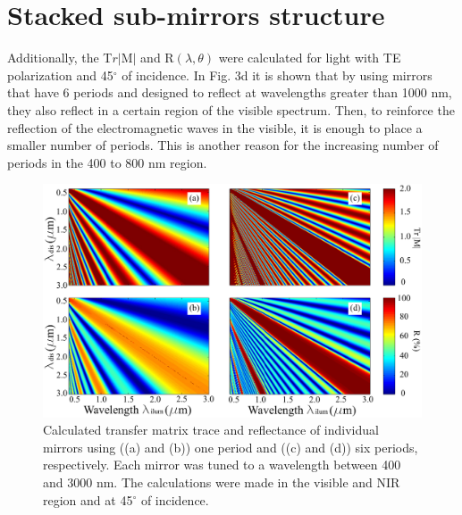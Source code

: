 \documentclass[a4paper,fleqn]{cas-sc}
\begin{document}
\newpage

\section{Stacked sub-mirrors structure}

Additionally, the T$r|\text{M}|$ and R$(\lambda,\theta)$ were calculated for light with TE 
polarization and 45${{}^\circ}$ of incidence. In Fig. 3d it is shown that by using 
mirrors that have 6 periods and designed to reflect at wavelengths greater than 1000 
nm, they also reflect in a certain region of the visible spectrum. Then, to 
reinforce the reflection of the electromagnetic waves in the visible, it is enough 
to place a smaller number of periods. This is another reason for the increasing 
number of periods in the 400 to 800 nm region. 
\begin{figure}[!ht]
	\begin{center}
		\includegraphics[width=\textwidth]
		{FigureS2.pdf}
	\end{center}
	\caption{Calculated transfer matrix trace and reflectance of individual mirrors using ((a) and (b)) one period  and ((c) and (d)) six periods, respectively. Each mirror was tuned to a wavelength between 400 and 3000 nm. The calculations were made in the visible and NIR region and at 45${{}^\circ}$ of incidence.}
	\label{Fig3}
\end{figure}
\end{document}
